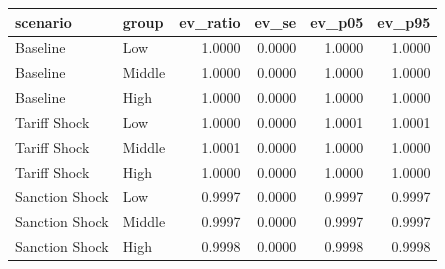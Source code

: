 \begin{tabular}{llrrrr}
\toprule
scenario & group & ev_ratio & ev_se & ev_p05 & ev_p95 \\
\midrule
Baseline & Low & 1.0000 & 0.0000 & 1.0000 & 1.0000 \\
Baseline & Middle & 1.0000 & 0.0000 & 1.0000 & 1.0000 \\
Baseline & High & 1.0000 & 0.0000 & 1.0000 & 1.0000 \\
Tariff Shock & Low & 1.0000 & 0.0000 & 1.0001 & 1.0001 \\
Tariff Shock & Middle & 1.0001 & 0.0000 & 1.0000 & 1.0000 \\
Tariff Shock & High & 1.0000 & 0.0000 & 1.0000 & 1.0000 \\
Sanction Shock & Low & 0.9997 & 0.0000 & 0.9997 & 0.9997 \\
Sanction Shock & Middle & 0.9997 & 0.0000 & 0.9997 & 0.9997 \\
Sanction Shock & High & 0.9998 & 0.0000 & 0.9998 & 0.9998 \\
\bottomrule
\end{tabular}
